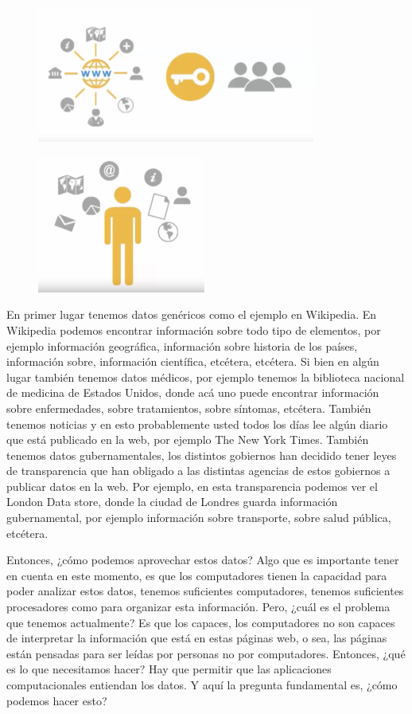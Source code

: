  \begin{figure}[H]
	\centering
	\includegraphics[height=4.5cm]{imagenes/capitulo3/5}
	\caption{}
\end{figure}

 \begin{figure}[H]
	\centering
	\includegraphics[height=4.5cm]{imagenes/capitulo3/6}
	\caption{}
\end{figure}


En primer lugar tenemos datos genéricos como el ejemplo en Wikipedia. En Wikipedia podemos encontrar información sobre todo tipo de elementos, por ejemplo información geográfica, información sobre historia de los países, información sobre, información científica, etcétera, etcétera. Si bien en algún lugar también tenemos datos médicos, por ejemplo tenemos la biblioteca nacional de medicina de Estados Unidos, donde acá uno puede encontrar información sobre enfermedades, sobre tratamientos, sobre síntomas, etcétera. También tenemos noticias y en esto probablemente usted todos los días lee algún diario que está publicado en la web, por ejemplo The New York Times. También tenemos datos gubernamentales, los distintos gobiernos han decidido tener leyes de transparencia que han obligado a las distintas agencias de estos gobiernos a publicar datos en la web. Por ejemplo, en esta transparencia podemos ver el London Data store, donde la ciudad de Londres guarda información gubernamental, por ejemplo información sobre transporte, sobre salud pública, etcétera.

Entonces, ¿cómo podemos aprovechar estos datos? Algo que es importante tener en cuenta en este momento, es que los computadores tienen la capacidad para poder analizar estos datos, tenemos suficientes computadores, tenemos suficientes procesadores como para organizar esta información. Pero, ¿cuál es el problema que tenemos actualmente? Es que los capaces, los computadores no son capaces de interpretar la información que está en estas páginas web, o sea, las páginas están pensadas para ser leídas por personas no por computadores. Entonces, ¿qué es lo que necesitamos hacer? Hay que permitir que las aplicaciones computacionales entiendan los datos. Y aquí la pregunta fundamental es, ¿cómo podemos hacer esto?

